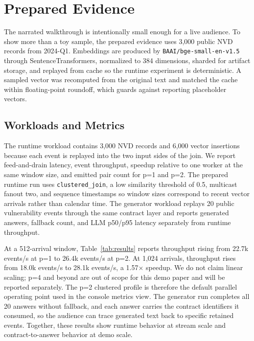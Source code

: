 \documentclass[sigconf]{acmart}
\begin{document}
\section{Prepared Evidence}
\label{sec:evidence}

The narrated walkthrough is intentionally small enough for a live audience. To show more than a toy sample, the prepared evidence uses 3,000 public NVD records from 2024-Q1. Embeddings are produced by \texttt{BAAI/bge-small-en-v1.5} through SentenceTransformers, normalized to 384 dimensions, sharded for artifact storage, and replayed from cache so the runtime experiment is deterministic. A sampled vector was recomputed from the original text and matched the cache within floating-point roundoff, which guards against reporting placeholder vectors.

\begin{table}[t]
  \centering
  
  \caption{Prepared evidence from real runs. Top: clustered runtime replay on 3,000 NVD records with BGE embeddings, using the p=1 baseline and the p=2 operating point used in the live profile. Bottom: a 20-event contract-to-answer generator run reports answer coverage, fallback count, and LLM latency.}
  \label{tab:results}
\end{table}

\subsection{Workloads and Metrics}

The runtime workload contains 3,000 NVD records and 6,000 vector insertions because each event is replayed into the two input sides of the join. We report feed-and-drain latency, event throughput, speedup relative to one worker at the same window size, and emitted pair count for p=1 and p=2. The prepared runtime run uses \texttt{clustered\_join}, a low similarity threshold of 0.5, multicast fanout two, and sequence timestamps so window sizes correspond to recent vector arrivals rather than calendar time. The generator workload replays 20 public vulnerability events through the same contract layer and reports generated answers, fallback count, and LLM p50/p95 latency separately from runtime throughput.

At a 512-arrival window, Table~\ref{tab:results} reports throughput rising from 22.7k events/s at p=1 to 26.4k events/s at p=2. At 1,024 arrivals, throughput rises from 18.0k events/s to 28.1k events/s, a 1.57$\times$ speedup. We do not claim linear scaling; p=4 and beyond are out of scope for this demo paper and will be reported separately. The p=2 clustered profile is therefore the default parallel operating point used in the console metrics view. The generator run completes all 20 answers without fallback, and each answer carries the contract identifiers it consumed, so the audience can trace generated text back to specific retained events. Together, these results show runtime behavior at stream scale and contract-to-answer behavior at demo scale.
\end{document}
